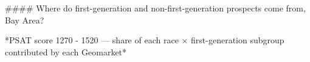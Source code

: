 #### Where do first-generation and non-first-generation prospects come from, Bay Area?

*PSAT score 1270 - 1520 — share of each race × first-generation subgroup contributed by each Geomarket*
